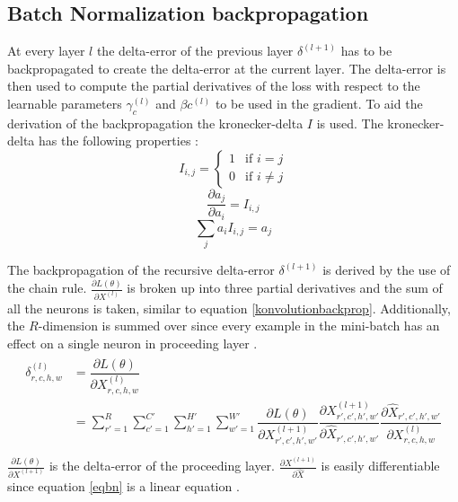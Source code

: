 \documentclass[a4paper, twoside]{article}
\newcommand*{\pd}[2]{\ensuremath{\dfrac{\partial #1}{\partial #2}}}
\newcommand*{\inpd}[2]{\ensuremath{\frac{\partial #1}{\partial #2}}}
\begin{document}
\subsection{Batch Normalization backpropagation}
At every layer $l$ the delta-error of the previous layer $\delta^{(l+1)}$ has to be backpropagated to create the delta-error at the current layer. The delta-error is then used to compute the partial derivatives of the loss with respect to the learnable parameters $\gamma_{c}^{(l)}$ and $\beta{c}^{(l)}$ to be used in the gradient. To aid the derivation of the backpropagation the kronecker-delta $I$ is used. The kronecker-delta has the following properties \cite{webBN1} \cite{webBN2}: 
\begin{equation}\label{kroneckerdelta}
I_{i,j} = \begin{cases} 1 & \mbox{if } i = j \\ 0 & \mbox{if } i \neq j  \end{cases}
\end{equation}
\begin{equation}\label{kroneckerdeltaDERIVATIVE}
\pd{a_{j}}{a_i} = I_{i,j}
\end{equation}
\begin{equation}\label{kroneckerdeltaSUM}
\sum_j  a_i  I_{i,j} = a_j
\end{equation}

The backpropagation of the recursive delta-error $\delta^{(l+1)}$ is derived by the use of the chain rule. $\inpd{L(\theta)}{X^{(l)}}$ is broken up into three partial derivatives and the sum of all the neurons is taken, similar to equation \eqref{konvolutionbackprop}. Additionally, the $R$-dimension is summed over since every example in the mini-batch has an effect on a single neuron in proceeding layer \cite{webBN1} \cite{webBN2}. 
\begin{align}\label{BN_delta_error}
\begin{split}
	\delta^{(l)}_{r,c,h,w}
		& = \pd{L(\theta)}{X^{(l)}_{r,c,h,w}} \\
		& = \sum^{R }_{r'=1} \sum^{C' }_{c'=1} \sum^{H' }_{h'=1} \sum^{W' }_{w'=1} \pd{L(\theta)}{X^{(l+1)}_{r',c',h',w'}} \pd{X^{(l+1)}_{r',c',h',w'}}{\hat{X}_{r',c',h',w'}} \pd{\hat{X}_{r',c',h',w'}}{{X}^{(l)}_{r,c,h,w}}\\
\end{split}
\end{align}
$\inpd{L(\theta)}{X^{(l+1)}}$ is the delta-error of the proceeding layer. $\inpd{X^{(l+1)}}{\hat{X}}$ is easily differentiable since equation \eqref{eqbn} is a linear equation \cite{webBN1} \cite{webBN2}.
\end{document}
